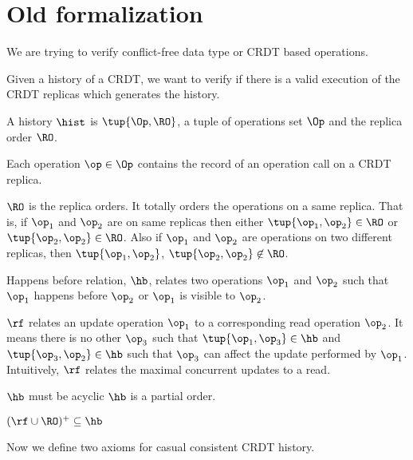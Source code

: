 
\section{Old formalization}

We are trying to verify conflict-free data type or CRDT based operations.

Given a history of a CRDT, we want to verify if there is a valid execution of the CRDT replicas which generates the history.

\begin{definition}
 A history $\hist$ is $\tup{\Op, \RO}$, a tuple of operations set $\Op$ and the replica order $\RO$.
\end{definition}


Each operation $\op \in \Op$ contains the record of an operation call on a CRDT replica.

$\RO$ is the replica orders. It totally orders the operations on a same replica. That is, if $\op_1$ and $\op_2$ are on same replicas then either $\tup{\op_1, \op_2} \in \RO$ or $\tup{\op_2, \op_2} \in \RO$. Also if $\op_1$ and $\op_2$ are operations on two different replicas, then $\tup{\op_1, \op_2}$, $\tup{\op_2, \op_2} \not\in \RO$.

\begin{definition}
 Happens before relation, $\hb$, relates two operations $\op_1$ and $\op_2$ such that $\op_1$ happens before $\op_2$ or $\op_1$ is visible to $\op_2$.
\end{definition}


\begin{definition}
 $\rf$ relates an update operation $\op_1$ to a corresponding read operation $\op_2$. It means there is no other $\op_3$ such that $\tup{\op_1, \op_3} \in \hb$ and $\tup{\op_3, \op_2} \in \hb$ such that $\op_3$ can affect the update performed by $\op_1$. Intuitively, $\rf$ relates the maximal concurrent updates to a read.
\end{definition}

$\hb$ must be acyclic \ie $\hb$ is a partial order.

$(\rf \cup \RO)^+ \subseteq \hb$

Now we define two axioms for casual consistent CRDT history.


